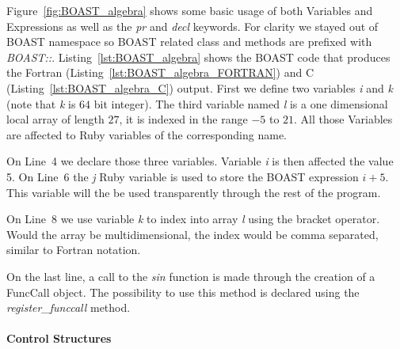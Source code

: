 \documentclass{IEEEtran}
\begin{document}
Figure~\ref{fig:BOAST_algebra} shows some basic usage of both Variables and
Expressions as well as the \emph{pr} and \emph{decl} keywords. For clarity we
stayed out of BOAST namespace so BOAST related class and methods are prefixed
with \emph{BOAST::}. Listing~\ref{lst:BOAST_algebra} shows the BOAST code that
produces the Fortran (Listing~\ref{lst:BOAST_algebra_FORTRAN}) and C
(Listing~\ref{lst:BOAST_algebra_C}) output. First we define two variables
\emph{i} and \emph{k} (note that \emph{k} is $64$ bit integer). The third
variable named \emph{l} is a one dimensional local array of length $27$, it
is indexed in the range $-5$ to $21$. All those Variables are affected to Ruby
variables of the corresponding name.

On Line~4 we declare those three variables. Variable \emph{i} is then affected
the value 5. On Line~6 the \emph{j} Ruby variable is used to store the BOAST
expression \emph{$i+5$}. This variable will the be used transparently through
the rest of the program.

On Line~8 we use variable \emph{k} to index into array \emph{l} using the
bracket operator. Would the array be multidimensional, the index would be comma
separated, similar to Fortran notation.

On the last line, a call to the \emph{sin} function is made through the creation
of a FuncCall object.  The possibility to use this method is declared using the
\emph{register\_funccall} method.

      \paragraph{Control Structures}
\end{document}
